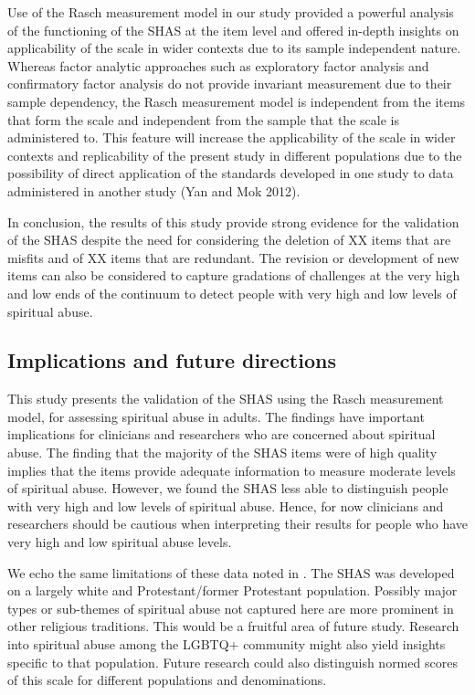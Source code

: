 \documentclass[
]{article}
\begin{document}
Use of the Rasch measurement model in our study provided a powerful analysis of the functioning of the SHAS at the item level and offered in-depth insights on applicability of the scale in wider contexts due to its sample independent nature. Whereas factor analytic approaches such as exploratory factor analysis and confirmatory factor analysis do not provide invariant measurement due to their sample dependency, the Rasch measurement model is independent from the items that form the scale and independent from the sample that the scale is administered to. This feature will increase the applicability of the scale in wider contexts and replicability of the present study in different populations due to the possibility of direct application of the standards developed in one study to data administered in another study (Yan and Mok 2012).

In conclusion, the results of this study provide strong evidence for the validation of the SHAS despite the need for considering the deletion of XX items that are misfits and of XX items that are redundant. The revision or development of new items can also be considered to capture gradations of challenges at the very high and low ends of the continuum to detect people with very high and low levels of spiritual abuse.

\hypertarget{implications-and-future-directions}{%
\subsection{Implications and future directions}\label{implications-and-future-directions}}

This study presents the validation of the SHAS using the Rasch measurement model, for assessing spiritual abuse in adults. The findings have important implications for clinicians and researchers who are concerned about spiritual abuse. The finding that the majority of the SHAS items were of high quality implies that the items provide adequate information to measure moderate levels of spiritual abuse. However, we found the SHAS less able to distinguish people with very high and low levels of spiritual abuse. Hence, for now clinicians and researchers should be cautious when interpreting their results for people who have very high and low spiritual abuse levels.

We echo the same limitations of these data noted in \citet{KochEdstrom2022}. The SHAS was developed on a largely white and Protestant/former Protestant population. Possibly major types or sub-themes of spiritual abuse not captured here are more prominent in other religious traditions. This would be a fruitful area of future study. Research into spiritual abuse among the LGBTQ+ community might also yield insights specific to that population. Future research could also distinguish normed scores of this scale for different populations and denominations.
\end{document}
